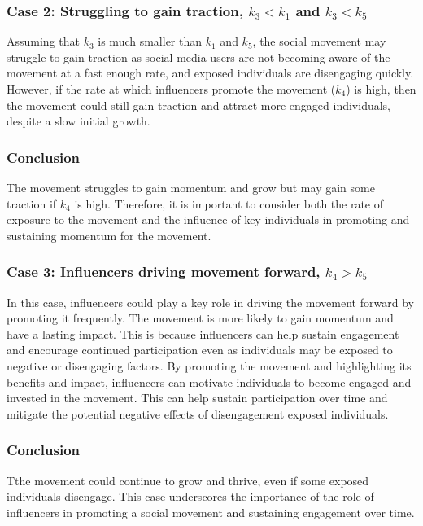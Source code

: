 \documentclass{article}
\begin{document}
    \subsubsection*{Case 2: Struggling to gain traction, $k_3 < k_1$ and $k_3 < k_5$}
    \begin{tcolorbox}
    Assuming that $k_3$ is much smaller than $k_1$ and $k_5$, the social movement may struggle to gain traction as social media users are not becoming aware of the movement at a fast enough rate, and exposed individuals are disengaging quickly. However, if the rate at which influencers promote the movement ($k_4$) is high, then the movement could still gain traction and attract more engaged individuals, despite a slow initial growth.
    \subsubsection*{Conclusion} The movement  struggles to gain momentum and grow but may gain some traction if $k_4$ is high. Therefore, it is important to consider both the rate of exposure to the movement and the influence of key individuals in promoting and sustaining momentum for the movement.
    \end{tcolorbox}
    
    \subsubsection*{Case 3: Influencers driving movement forward, $k_4 > k_5$} \normalfont
    \begin{tcolorbox}
     In this case, influencers could play a key role in driving the movement forward by promoting it frequently. The movement is more likely to gain momentum and have a lasting impact. This is because influencers can help sustain engagement and encourage continued participation even as individuals may be exposed to negative or disengaging factors. By promoting the movement and highlighting its benefits and impact, influencers can motivate individuals to become engaged and invested in the movement. This can help sustain participation over time and mitigate the potential negative effects of disengagement  exposed individuals.
    \subsubsection*{Conclusion}Tthe movement could continue to grow and thrive, even if some exposed individuals disengage. This case underscores the importance of the role of influencers in promoting a social movement and sustaining engagement over time. 
    \end{tcolorbox}
\end{document}
